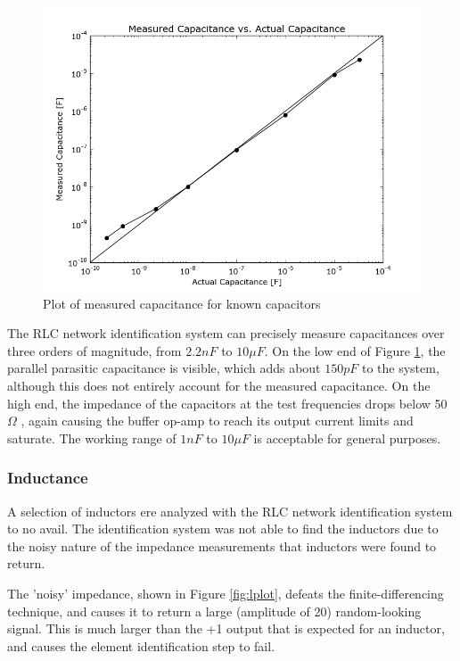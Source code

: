 \documentclass[11pt,twoside]{mitthesis}
\newcommand{\ohm}{$\Omega$ }
\begin{document}
\begin{figure}[h]
	\label{fig:cplot}
  \begin{center}
      \includegraphics[width=.7\textwidth]{../cin-co.png}
      \caption{Plot of measured capacitance for known capacitors}
  \end{center}
\end{figure}

The RLC network identification system can precisely measure capacitances over three orders of magnitude, from $2.2nF$ to $10\mu F$.
On the low end of Figure \ref{fig:cplot}, the parallel parasitic capacitance is visible, which adds about $150pF$ to the system, although this does not entirely account for the measured capacitance.
On the high end, the impedance of the capacitors at the test frequencies drops below 50\ohm, again causing the buffer op-amp to reach its output current limits and saturate.
The working range of $1nF$ to $10\mu F$ is acceptable for general purposes.

\subsubsection{Inductance}



A selection of inductors ere analyzed with the RLC network identification system to no avail.
The identification system was not able to find the inductors due to the noisy nature of the impedance measurements that inductors were found to return.


The 'noisy' impedance, shown in Figure \ref{fig:lplot}, defeats the finite-differencing technique, and causes it to return a large (amplitude of 20) random-looking signal.
This is much larger than the +1 output that is expected for an inductor, and causes the element identification step to fail.
\end{document}
